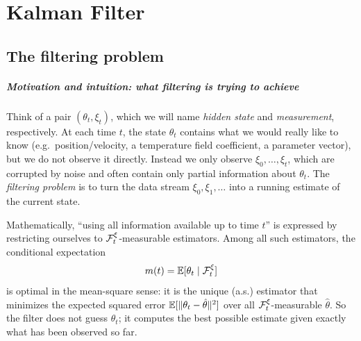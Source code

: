 
\chapter{Kalman Filter}

\section{The filtering problem}


\paragraph{Motivation and intuition: what filtering is trying to achieve}
Think of a pair \((\theta_t,\xi_t)\), which we will name \emph{hidden state} and \emph{measurement}, respectively.
At each time \(t\), the state \(\theta_t\) contains what we would really like to know (e.g.\ position/velocity, a temperature field coefficient, a parameter vector), but we do not observe it directly.
Instead we only observe \(\xi_0,\dots,\xi_t\), which are corrupted by noise and often contain only partial information about \(\theta_t\).
The \emph{filtering problem} is to turn the data stream \(\xi_0,\xi_1,\dots\) into a running estimate of the current state.

Mathematically, ``using all information available up to time \(t\)'' is expressed by restricting ourselves to \(\mathcal{F}_t^\xi\)-measurable estimators.
Among all such estimators, the conditional expectation
\[
m(t)=\mathbb{E}[\theta_t\mid \mathcal{F}_t^\xi]
\]
is optimal in the mean-square sense: it is the unique (a.s.) estimator that minimizes the expected squared error
\(\mathbb{E}[\|\theta_t-\hat\theta\|^2]\) over all \(\mathcal{F}_t^\xi\)-measurable \(\hat\theta\).
So the filter does not guess \(\theta_t\); it computes the best possible estimate given exactly what has been observed so far.

